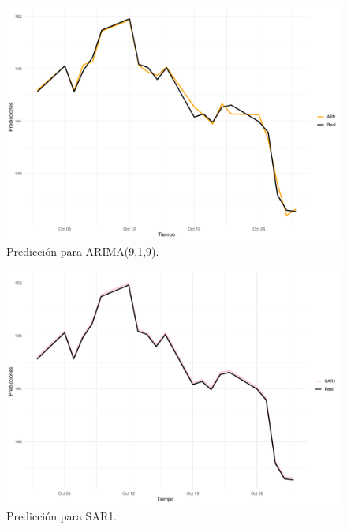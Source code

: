 \documentclass[conference]{IEEEtran}
\begin{document}
\begin{figure}
    \centering
    \includegraphics[width=\columnwidth]{figs/all3.pdf}
    \caption{Predicción para ARIMA(9,1,9).}
\end{figure}

\begin{figure}
    \centering
    \includegraphics[width=\columnwidth]{figs/all4.pdf}
    \caption{Predicción para SAR1.}
\end{figure}
\end{document}
